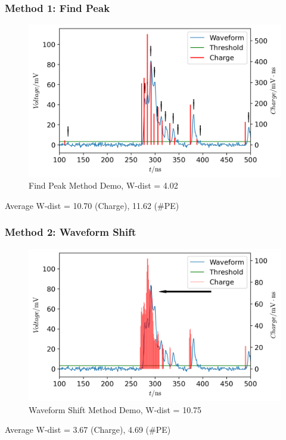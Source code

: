 \documentclass{beamer}
\begin{document}
\begin{frame}
\frametitle{Method 1: Find Peak}
\begin{figure}
    \centering
    \caption{Find Peak Method Demo, W-dist = 4.02}
    \includegraphics[width=0.9\linewidth]{img/findpeak.png}
\end{figure}
\vspace{-4mm}
\begin{center}
    Average W-dist = 10.70 (Charge), 11.62 (\#PE)
\end{center}
\end{frame}

\begin{frame}
\frametitle{Method 2: Waveform Shift}
\begin{figure}
    \centering
    \caption{Waveform Shift Method Demo, W-dist = 10.75}
    \includegraphics[width=0.9\linewidth]{img/threshold.png}
\end{figure}
\vspace{-4mm}
\begin{center}
    Average W-dist = 3.67 (Charge), 4.69 (\#PE)
\end{center}
\end{frame}
\end{document}
